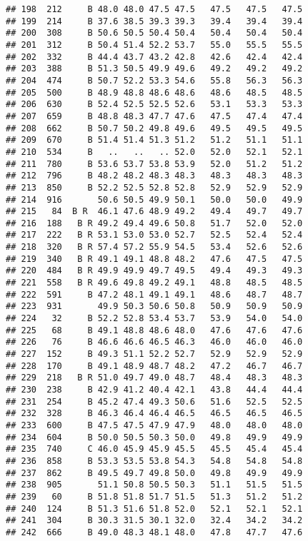 \documentclass[]{article}
\begin{document}
\begin{verbatim}
## 198  212     B 48.0 48.0 47.5 47.5   47.5   47.5   47.5
## 199  214     B 37.6 38.5 39.3 39.3   39.4   39.4   39.4
## 200  308     B 50.6 50.5 50.4 50.4   50.4   50.4   50.4
## 201  312     B 50.4 51.4 52.2 53.7   55.0   55.5   55.5
## 202  332     B 44.4 43.7 43.2 42.8   42.6   42.4   42.4
## 203  388     B 51.3 50.5 49.9 49.6   49.2   49.2   49.2
## 204  474     B 50.7 52.2 53.3 54.6   55.8   56.3   56.3
## 205  500     B 48.9 48.8 48.6 48.6   48.6   48.5   48.5
## 206  630     B 52.4 52.5 52.5 52.6   53.1   53.3   53.3
## 207  659     B 48.8 48.3 47.7 47.6   47.5   47.4   47.4
## 208  662     B 50.7 50.2 49.8 49.6   49.5   49.5   49.5
## 209  670     B 51.4 51.4 51.3 51.2   51.2   51.1   51.1
## 210  534     B   ..   ..   .. 52.0   52.0   52.1   52.1
## 211  780     B 53.6 53.7 53.8 53.9   52.0   51.2   51.2
## 212  796     B 48.2 48.2 48.3 48.3   48.3   48.3   48.3
## 213  850     B 52.2 52.5 52.8 52.8   52.9   52.9   52.9
## 214  916       50.6 50.5 49.9 50.1   50.0   50.0   49.9
## 215   84  B R  46.1 47.6 48.9 49.2   49.4   49.7   49.7
## 216  188   B R 49.2 49.4 49.6 50.8   51.7   52.0   52.0
## 217  222   B R 53.1 53.0 53.0 52.7   52.5   52.4   52.4
## 218  320   B R 57.4 57.2 55.9 54.5   53.4   52.6   52.6
## 219  340   B R 49.1 49.1 48.8 48.2   47.6   47.5   47.5
## 220  484   B R 49.9 49.9 49.7 49.5   49.4   49.3   49.3
## 221  558   B R 49.6 49.8 49.2 49.1   48.8   48.5   48.5
## 222  591     B 47.2 48.1 49.1 49.1   48.6   48.7   48.7
## 223  931       49.9 50.3 50.6 50.8   50.9   50.9   50.9
## 224   32     B 52.2 52.8 53.4 53.7   53.9   54.0   54.0
## 225   68     B 49.1 48.8 48.6 48.0   47.6   47.6   47.6
## 226   76     B 46.6 46.6 46.5 46.3   46.0   46.0   46.0
## 227  152     B 49.3 51.1 52.2 52.7   52.9   52.9   52.9
## 228  170     B 49.1 48.9 48.7 48.2   47.2   46.7   46.7
## 229  218   B R 51.0 49.7 49.0 48.7   48.4   48.3   48.3
## 230  238     B 42.9 41.2 40.4 42.1   43.8   44.4   44.4
## 231  254     B 45.2 47.4 49.3 50.6   51.6   52.5   52.5
## 232  328     B 46.3 46.4 46.4 46.5   46.5   46.5   46.5
## 233  600     B 47.5 47.5 47.9 47.9   48.0   48.0   48.0
## 234  604     B 50.0 50.5 50.3 50.0   49.8   49.9   49.9
## 235  740     C 46.0 45.9 45.9 45.5   45.5   45.4   45.4
## 236  858     B 53.3 53.5 53.8 54.3   54.8   54.8   54.8
## 237  862     B 49.5 49.7 49.8 50.0   49.8   49.9   49.9
## 238  905       51.1 50.8 50.5 50.3   51.1   51.5   51.5
## 239   60     B 51.8 51.8 51.7 51.5   51.3   51.2   51.2
## 240  124     B 51.3 51.6 51.8 52.0   52.1   52.1   52.1
## 241  304     B 30.3 31.5 30.1 32.0   32.4   34.2   34.2
## 242  666     B 49.0 48.3 48.1 48.0   47.8   47.7   47.6

\end{verbatim}
\end{document}
